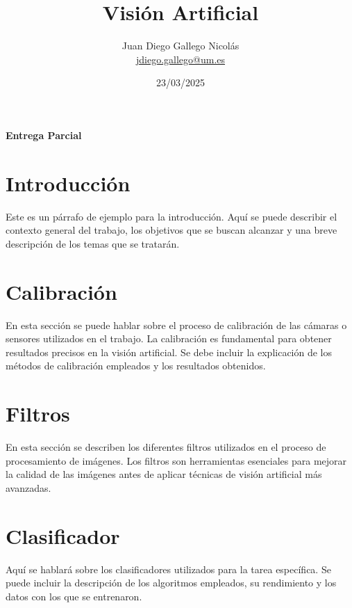 \documentclass[12pt]{article}
\title{\Huge Visión Artificial}
\author{\Large Juan Diego Gallego Nicolás\\ \href{mailto:jdiego.gallego@um.es}{jdiego.gallego@um.es}}
\date{\Large 23/03/2025}
\begin{document}
\maketitle
\thispagestyle{empty}

\begin{center}
    \vspace{2cm}
    \textbf{Entrega Parcial}
\end{center}

\newpage

\tableofcontents
\newpage

\section{Introducción}
Este es un párrafo de ejemplo para la introducción. Aquí se puede describir el contexto general del trabajo, los objetivos que se buscan alcanzar y una breve descripción de los temas que se tratarán.

\newpage

\section{Calibración}
En esta sección se puede hablar sobre el proceso de calibración de las cámaras o sensores utilizados en el trabajo. La calibración es fundamental para obtener resultados precisos en la visión artificial. Se debe incluir la explicación de los métodos de calibración empleados y los resultados obtenidos.

\newpage

\section{Filtros}
En esta sección se describen los diferentes filtros utilizados en el proceso de procesamiento de imágenes. Los filtros son herramientas esenciales para mejorar la calidad de las imágenes antes de aplicar técnicas de visión artificial más avanzadas.

\newpage

\section{Clasificador}
Aquí se hablará sobre los clasificadores utilizados para la tarea específica. Se puede incluir la descripción de los algoritmos empleados, su rendimiento y los datos con los que se entrenaron.
\end{document}
